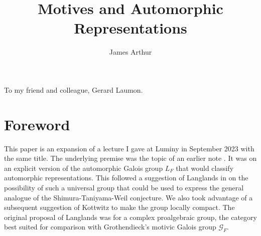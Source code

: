 \documentclass[preprint,12pt, leqno]{elsarticle}
\newcommand{\UGal}{\mathcal{G}_F}
\numberwithin{equation}{section}
\theoremstyle{named}
\begin{document}
\begin{frontmatter}


\title{Motives and Automorphic Representations}



\author{James Arthur}



\end{frontmatter}
\begin{flushright}
  To my friend and colleague, Gerard Laumon.  
\end{flushright}


\tableofcontents

\section*{Foreword}\label{sec:forword}

This paper is an expansion of a lecture I gave at Luminy in September 2023 with the same title. The underlying premise was the topic of an earlier note \cite{Ar2}. It was on an explicit version of the automorphic Galois group $L_F$ that would classify automorphic representations. This followed a suggestion of Langlands in \cite[Section 2]{L4} on the possibility of such a universal group that could be used to express the general analogue of the Shimura-Taniyama-Weil conjecture. We also took advantage of a subsequent suggestion of Kottwitz \cite{KO} to make the group locally compact. The original proposal of Langlands was for a complex proalgebraic group, the category best suited for comparison with Grothendieck's motivic Galois group $\UGal$.
\end{document}
